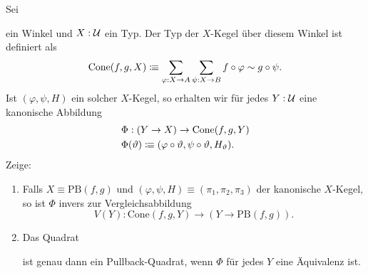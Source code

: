 \documentclass{uebung}
\begin{document}
\begin{exercise}
  Sei
  ein Winkel und $X:\mathcal{U}$ ein Typ.
  Der Typ der $X$-Kegel über diesem Winkel ist definiert als
  $$
  \mathrm{Cone}(f,g,X) \vcentcolon\mspace{-1.2mu}\equiv \sum_{\varphi:X\to A}\sum_{\psi:X\to B} f\circ\varphi \sim g\circ\psi.
  $$
  Ist $(\varphi,\psi,H)$ ein solcher $X$-Kegel, so erhalten wir für jedes $Y:\mathcal{U}$ eine kanonische Abbildung
  \begin{align*}
    &\Phi:(Y \to X) \to \mathrm{Cone}(f,g,Y)\\
    &\Phi(\vartheta)\vcentcolon\mspace{-1.2mu}\equiv (\varphi\circ\vartheta,\psi\circ\vartheta,H_\vartheta).
  \end{align*}
  Zeige:
  \begin{enumerate}
    \item Falls $X\equiv\mathrm{PB}(f,g)$ und $(\varphi,\psi,H)\equiv(\pi_1,\pi_2,\pi_3)$ der kanonische $X$-Kegel, so ist $\Phi$ invers zur Vergleichsabbildung
      $$
      V(Y):\mathrm{Cone}(f,g,Y)\to (Y\to\mathrm{PB}(f,g)).
      $$
    \item Das Quadrat
      \begin{center}
      \end{center}
      ist genau dann ein Pullback-Quadrat, wenn $\Phi$ für jedes $Y$ eine Äquivalenz ist.
  \end{enumerate}
\end{exercise}
\end{document}
